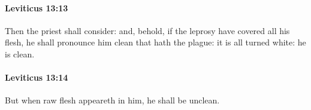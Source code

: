 		\paragraph{Leviticus 13:13} %
			\label{LEVITICUS-13-13}

			Then the priest shall consider: and, behold, if the leprosy have covered all his flesh, he shall pronounce him clean that hath the plague: it is all turned white: he is clean.


		\paragraph{Leviticus 13:14} %
			\label{LEVITICUS-13-14}

			But when raw flesh appeareth in him, he shall be unclean.


